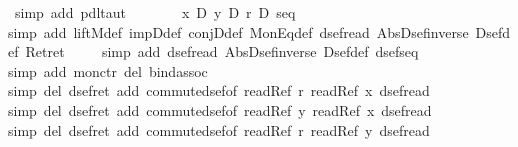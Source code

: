 \begin{isabellebody}
\ {\isacharparenleft}simp\ add{\isacharcolon}\ pdl{\isacharunderscore}taut{\isacharparenright}\isanewline
\ \ \isamarkupfalse%
\isanewline
\ \ \isamarkupfalse%
\ {\isachardoublequote}{\isasymturnstile}\ {\isacharquery}x\ {\isasymand}\isactrlsub D\ {\isacharquery}y\ {\isasymand}\isactrlsub D\ {\isacharquery}r\ {\isasymlongrightarrow}\isactrlsub D\ {\isacharquery}seq{\isachardoublequote}\isanewline
\ \ \ \ %
\isanewline
\ \ \ \ \isamarkupfalse%
simp\ add{\isacharcolon}\ liftM{}{\isacharunderscore}def\ impD{\isacharunderscore}def\ conjD{\isacharunderscore}def\ MonEq{\isacharunderscore}def\ dsef{\isacharunderscore}read\ Abs{\isacharunderscore}Dsef{\isacharunderscore}inverse\ Dsef{\isacharunderscore}def\ Ret{\isacharunderscore}ret{\isacharparenright}\isanewline
\ \ \ \ \isamarkupfalse%
simp\ add{\isacharcolon}\ dsef{\isacharunderscore}read\ Abs{\isacharunderscore}Dsef{\isacharunderscore}inverse\ Dsef{\isacharunderscore}def\ dsef{\isacharunderscore}seq{\isacharparenright}\isanewline
\ \ \ \ \isamarkupfalse%
simp\ add{\isacharcolon}\ mon{\isacharunderscore}ctr\ del{\isacharcolon}\ bind{\isacharunderscore}assoc{\isacharparenright}\isanewline
\ \ \ \ %
\isanewline
\ \ \ \ \isamarkupfalse%
simp\ del{\isacharcolon}\ dsef{\isacharunderscore}ret\ add{\isacharcolon}\ commute{\isacharunderscore}dsef{\isacharbrackleft}of\ {\isachardoublequote}readRef\ r{\isachardoublequote}\ {\isachardoublequote}readRef\ x{\isachardoublequote}{\isacharbrackright}\ dsef{\isacharunderscore}read{\isacharparenright}\isanewline
\ \ \ \ \isamarkupfalse%
simp\ del{\isacharcolon}\ dsef{\isacharunderscore}ret\ add{\isacharcolon}\ commute{\isacharunderscore}dsef{\isacharbrackleft}of\ {\isachardoublequote}readRef\ y{\isachardoublequote}\ {\isachardoublequote}readRef\ x{\isachardoublequote}{\isacharbrackright}\ dsef{\isacharunderscore}read{\isacharparenright}\isanewline
\ \ \ \ \isamarkupfalse%
simp\ del{\isacharcolon}\ dsef{\isacharunderscore}ret\ add{\isacharcolon}\ commute{\isacharunderscore}dsef{\isacharbrackleft}of\ {\isachardoublequote}readRef\ r{\isachardoublequote}\ {\isachardoublequote}readRef\ y{\isachardoublequote}{\isacharbrackright}\ dsef{\isacharunderscore}read{\isacharparenright}\isanewline

\end{isabellebody}
